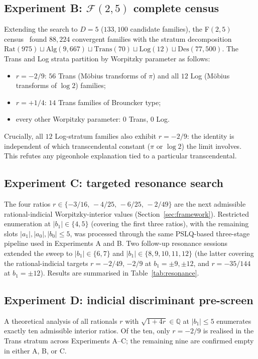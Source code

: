 \documentclass[11pt]{amsart}
\theoremstyle{definition}
\theoremstyle{remark}
\newcommand{\FF}{\mathcal{F}}
\newcommand{\Rat}{\mathrm{Rat}}
\newcommand{\Log}{\mathrm{Log}}
\newcommand{\Alg}{\mathrm{Alg}}
\newcommand{\Trans}{\mathrm{Trans}}
\newcommand{\Des}{\mathrm{Des}}
\begin{document}
\subsection*{Experiment B: $\FF(2,5)$ complete census}
Extending the search to $D = 5$ ($133{,}100$ candidate families), the
F$(2,5)$ census~\cite{F25} found $88{,}224$ convergent families with
the stratum decomposition $\Rat(975) \sqcup \Alg(9{,}667) \sqcup
\Trans(70) \sqcup \Log(12) \sqcup \Des(77{,}500)$.  The Trans and
Log strata partition by Worpitzky parameter as follows:
\begin{itemize}
\item $r = -2/9$: $56$ Trans (M\"obius transforms of $\pi$) and
all $12$ Log (M\"obius transforms of $\log 2$) families;
\item $r = +1/4$: $14$ Trans families of Brouncker type;
\item every other Worpitzky parameter: $0$ Trans, $0$ Log.
\end{itemize}
Crucially, all $12$ Log-stratum families also exhibit $r = -2/9$:
the identity is independent of which transcendental constant
($\pi$ or $\log 2$) the limit involves.  This refutes any pigeonhole
explanation tied to a particular transcendental.

\subsection*{Experiment C: targeted resonance search}
The four ratios $r \in \{-3/16,\,-4/25,\,-6/25,\,-2/49\}$ are the
next admissible rational-indicial Worpitzky-interior values
(Section~\ref{sec:framework}).  Restricted enumeration at
$|b_1| \in \{4, 5\}$ (covering the first three ratios), with the
remaining slots $|a_1|, |a_0|, |b_0| \le 5$, was processed through
the same PSLQ-based three-stage pipeline used in Experiments A and
B.  Two follow-up resonance sessions extended the sweep to
$|b_1| \in \{6, 7\}$ and $|b_1| \in \{8,9,10,11,12\}$
(the latter covering the rational-indicial targets $r = -2/49$,
$-2/9$ at $b_1 = \pm 9, \pm 12$, and $r = -35/144$ at
$b_1 = \pm 12$).  Results are summarised in
Table~\ref{tab:resonance}.

\subsection*{Experiment D: indicial discriminant pre-screen}
A theoretical analysis of all rationals $r$ with $\sqrt{1 + 4r} \in
\mathbb Q$ at $|b_1| \le 5$ enumerates exactly ten admissible interior
ratios.  Of the ten, only $r = -2/9$ is realised in the Trans stratum
across Experiments A--C; the remaining nine are confirmed empty in
either A, B, or C.
\end{document}

